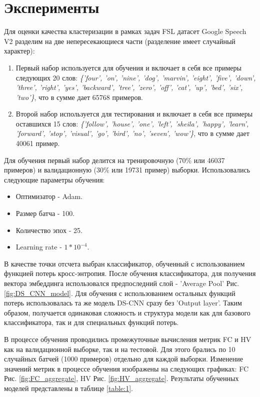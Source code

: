 \section{Эксперименты}
\label{sec:Chapter5} 

\par
Для оценки качества кластеризации в рамках задач FSL датасет Google Speech V2 разделим на две непересекающиеся части (разделение имеет случайный характер): 
\begin{enumerate}
    \item Первый набор используется для обучения и включает в себя все примеры следующих 20 слов: \textit{ \{'four', 'on', 'nine', 'dog', 'marvin', 'eight', 'five', 'down', 'three', 'right', 'yes', 'backward', 'tree', 'zero', 'off', 'cat', 'up', 'bed', 'six', 'two'\}}, что в сумме дает 65768 примеров.
    \item Второй набор используется для тестирования и включает в себя все примеры оставшихся 15 слов: \textit{\{'follow', 'house', 'one', 'left', 'sheila', 'happy', 'learn', 'forward', 'stop', 'visual', 'go', 'bird', 'no', 'seven', 'wow'\}}, что в сумме дает 40061 пример.
\end{enumerate}
Для обучения первый набор делится на тренировочную (70\% или 46037 примеров) и валидационную (30\% или 19731 пример) выборки. Использовались следующие параметры обучения:

\begin{itemize}
    \item Оптимизатор - Adam.
    \item Размер батча - 100.
    \item Количество эпох - 25.
    \item Learning rate - $1 * 10^{-4}$.
\end{itemize}

\par
В качестве точки отсчета выбран классификатор, обученный с использованием функцией потерь кросс-энтропия. После обучения классификатора, для получения вектора эмбеддинга использовался предпоследний слой - 'Average Pool' Рис.\ref{fig:DS_CNN_model}. Для обучения с использованием остальных функций потерь использовалась та же модель DS-CNN сразу без 'Output layer'. Таким образом, получается одинаковая сложность и структура модели как для базового классификатора, так и для специальных функций потерь.

\par
В процессе обучения проводились промежуточные вычисления метрик FC и HV как на валидационной выборке, так и на тестовой. Для этого брались по 10 случайных батчей (1000 примеров) отдельно для каждой выборки. Изменение значений метрик в процессе обучения изображены на следующих графиках: FC Рис. \ref{fig:FC_aggregate}, HV Рис. \ref{fig:HV_aggregate}. Результаты обученных моделей представлены в таблице \ref{table:1}.

